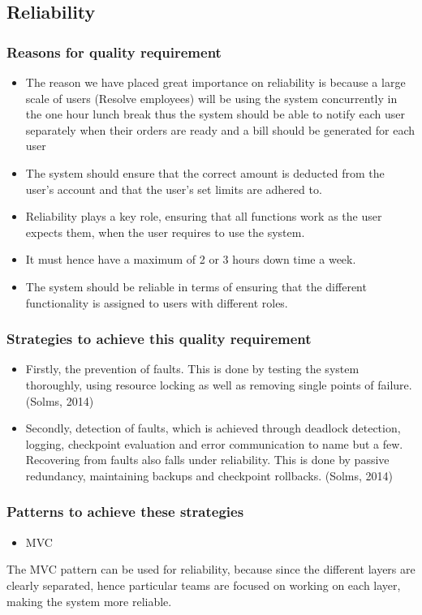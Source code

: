 \documentclass[12pt]{article}
\begin{document}
\subsection{Reliability}
\subsubsection{Reasons for quality requirement}
	\begin{itemize}
	\item The reason we have placed great importance on reliability is because a large scale of users (Resolve employees) will be using the system concurrently in the one hour lunch break thus the system should be able to notify each user separately when their orders are ready and a bill should be generated for each user
	\item The system should ensure that the correct amount is deducted from the user's account and that the user's set limits are adhered to.
	\item Reliability plays a key role, ensuring that all functions work as the user expects them, when the user requires to use the system.
	\item It must hence have a maximum of 2 or 3 hours down time a week.
	\item The system should be reliable in terms of ensuring that the different functionality is assigned to users with different roles.  
	\end{itemize}
	\subsubsection{Strategies to achieve this quality requirement}
	\begin{itemize}
	\item Firstly, the prevention of faults. This is done by testing the system thoroughly, using resource locking as well as removing single points of failure. (Solms, 2014)
 \item Secondly, detection of faults, which is achieved through deadlock detection, logging, checkpoint evaluation and error communication to name but a few. Recovering from faults also falls under reliability. This is done by passive redundancy, maintaining backups and checkpoint rollbacks. (Solms, 2014)
 \end{itemize}
 \subsubsection{Patterns to achieve these strategies}
 \begin{itemize}
 \item MVC
 \end{itemize}
 The MVC pattern can  be used for reliability, because since the different layers are clearly separated, hence particular teams are focused on working on each layer, making the system more reliable. 
\end{document}
